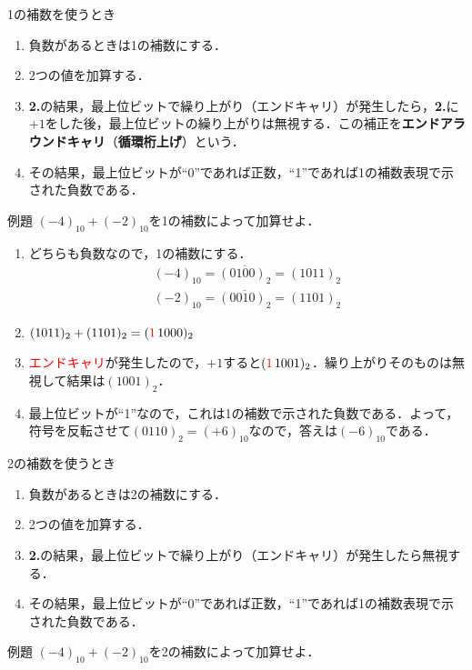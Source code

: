 \begin{enumerate}[label=\textbf{[\arabic*]}, labelsep=10pt, leftmargin=23pt]
	\item \textsf{1の補数を使うとき}
		\begin{enumerate}[label=\textbf{\arabic*.}, labelsep=10pt, leftmargin=23pt]
			\item 負数があるときは1の補数にする．
			\item 2つの値を加算する．
			\item \textbf{2.}の結果，最上位ビットで繰り上がり（エンドキャリ）が発生したら，\textbf{2.}に$+1$をした後，最上位ビットの繰り上がりは無視する．この補正を\textbf{エンドアラウンドキャリ}（\textbf{循環桁上げ}）という．
			\item その結果，最上位ビットが“0”であれば正数，“1”であれば1の補数表現で示された負数である．
		\end{enumerate}
		\begin{tip}{例題}
			\textsf{
				$(-4)_{10} + (-2)_{10}$を1の補数によって加算せよ．
			}

			\tcblower

			\begin{enumerate}[label=\textbf{\arabic*.}, labelsep=10pt, leftmargin=23pt]
				\item どちらも負数なので，1の補数にする．
					\begin{gather*}
						(-4)_{10} = \overline{(0100)_{2}} = (1011)_{2}\\
						(-2)_{10} = \overline{(0010)_{2}} = (1101)_{2}
					\end{gather*}
				\item $(1011)_{2} + (1101)_{2} = ({\color{red}1}\,1000)_{2}$
				\item \textcolor{red}{エンドキャリ}が発生したので，$+1$すると$({\color{red}1}\,1001)_{2}$．繰り上がりそのものは無視して結果は$(1001)_{2}$．
				\item 最上位ビットが“1”なので，これは1の補数で示された負数である．よって，符号を反転させて$(0110)_{2} = (+6)_{10}$なので，答えは$(-6)_{10}$である．
			\end{enumerate}
		\end{tip}
	\item \textsf{2の補数を使うとき}
		\begin{enumerate}[label=\textbf{\arabic*.}, labelsep=10pt, leftmargin=23pt]
			\item 負数があるときは2の補数にする．
			\item 2つの値を加算する．
			\item \textbf{2.}の結果，最上位ビットで繰り上がり（エンドキャリ）が発生したら無視する．
			\item その結果，最上位ビットが“0”であれば正数，“1”であれば1の補数表現で示された負数である．
		\end{enumerate}
		\begin{tip}{例題}
			\textsf{
				$(-4)_{10} + (-2)_{10}$を2の補数によって加算せよ．
			}


\end{tip}
\end{enumerate}

